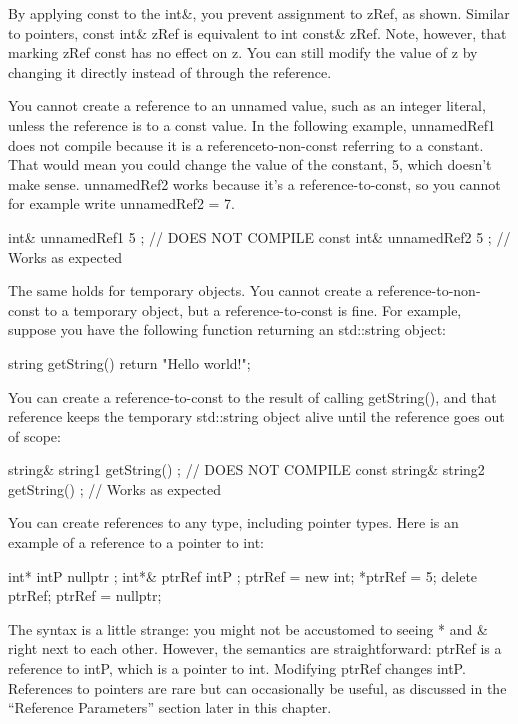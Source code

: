 By applying const to the int\&, you prevent assignment to zRef, as shown. Similar to pointers, const int\& zRef is equivalent to int const\& zRef. Note, however, that marking zRef const has no effect on z. You can still modify the value of z by changing it directly instead of through the reference.

You cannot create a reference to an unnamed value, such as an integer literal, unless the reference is to a const value. In the following example, unnamedRef1 does not compile because it is a referenceto-non-const referring to a constant. That would mean you could change the value of the constant, 5, which doesn’t make sense. unnamedRef2 works because it’s a reference-to-const, so you cannot for example write unnamedRef2 = 7.

\begin{cpp}
int& unnamedRef1 { 5 }; // DOES NOT COMPILE
const int& unnamedRef2 { 5 }; // Works as expected
\end{cpp}

The same holds for temporary objects. You cannot create a reference-to-non-const to a temporary object, but a reference-to-const is fine. For example, suppose you have the following function returning an std::string object:

\begin{cpp}
string getString() { return "Hello world!"; }
\end{cpp}

You can create a reference-to-const to the result of calling getString(), and that reference keeps the temporary std::string object alive until the reference goes out of scope:

\begin{cpp}
string& string1 { getString() }; // DOES NOT COMPILE
const string& string2 { getString() }; // Works as expected
\end{cpp}


You can create references to any type, including pointer types. Here is an example of a reference to a pointer to int:

\begin{cpp}
int* intP { nullptr };
int*& ptrRef { intP };
ptrRef = new int;
*ptrRef = 5;
delete ptrRef; ptrRef = nullptr;
\end{cpp}

The syntax is a little strange: you might not be accustomed to seeing * and \& right next to each other. However, the semantics are straightforward: ptrRef is a reference to intP, which is a pointer to int. Modifying ptrRef changes intP. References to pointers are rare but can occasionally be useful, as discussed in the “Reference Parameters” section later in this chapter.

